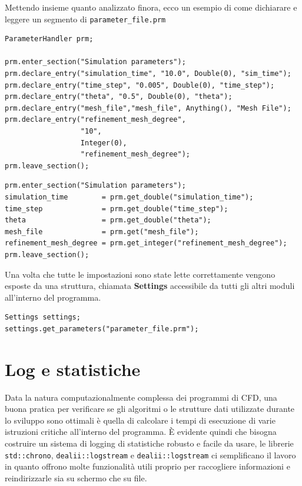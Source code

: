             Mettendo insieme quanto analizzato finora, ecco un esempio di come dichiarare e leggere un segmento di \texttt{parameter\_file.prm}
            \begin{verbatim}
ParameterHandler prm;

prm.enter_section("Simulation parameters");
prm.declare_entry("simulation_time", "10.0", Double(0), "sim_time");
prm.declare_entry("time_step", "0.005", Double(0), "time_step");
prm.declare_entry("theta", "0.5", Double(0), "theta");
prm.declare_entry("mesh_file","mesh_file", Anything(), "Mesh File");
prm.declare_entry("refinement_mesh_degree",
                  "10",
                  Integer(0),
                  "refinement_mesh_degree");
prm.leave_section();
            \end{verbatim}
            \begin{verbatim}
prm.enter_section("Simulation parameters");
simulation_time        = prm.get_double("simulation_time");
time_step              = prm.get_double("time_step");
theta                  = prm.get_double("theta");
mesh_file              = prm.get("mesh_file");
refinement_mesh_degree = prm.get_integer("refinement_mesh_degree");
prm.leave_section();
            \end{verbatim}

            Una volta che tutte le impostazioni sono state lette correttamente vengono esposte da una struttura, chiamata \textbf{Settings} accessibile da tutti gli altri moduli
            all'interno del programma.
            \begin{verbatim}
Settings settings;
settings.get_parameters("parameter_file.prm");
            \end{verbatim}
    \section{Log e statistiche}
    Data la natura computazionalmente complessa dei programmi di CFD, una buona pratica per verificare se gli algoritmi o le strutture dati utilizzate durante lo sviluppo sono ottimali è
    quella di calcolare i tempi di esecuzione di varie istruzioni critiche all'interno del programma.
    È evidente quindi che bisogna costruire un sistema di logging di statistiche robusto e facile da usare, le librerie \texttt{std::chrono}, \texttt{dealii::logstream} e \texttt{dealii::logstream} ci semplificano
    il lavoro in quanto offrono molte funzionalità utili proprio per raccogliere informazioni e reindirizzarle sia su schermo che su file.

